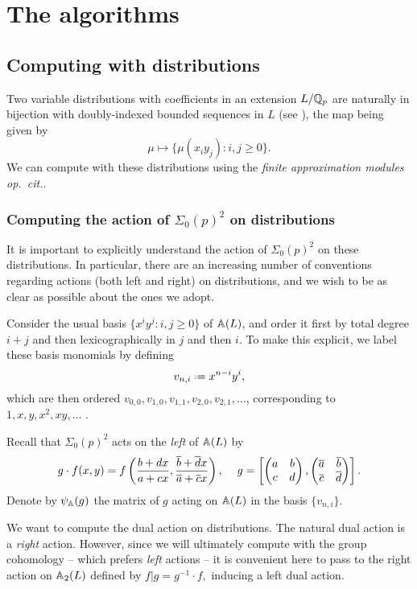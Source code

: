 \documentclass[a4paper,10pt]{article}
\numberwithin{equation}{section}
\begin{document}
\section{The algorithms}


\subsection{Computing with distributions}
Two variable distributions with coefficients in an extension $L/\mathbb{Q}_p$ are naturally in bijection with doubly-indexed bounded sequences in $L$ (see \cite[Proposition 3.6]{Wil17}), the map being given by
\[
 \mu \mapsto \{\mu(x_iy_j) : i,j \geq 0\}. 
\]
We can compute with these distributions using the \emph{finite approximation modules} \emph{op.\ cit.}.

\subsubsection{Computing the action of \texorpdfstring{$\Sigma_0(p)^2$}{S0(p)2} on distributions}

It is important to explicitly understand the action of $\Sigma_0(p)^2$ on these distributions. In particular, there are an increasing number of conventions regarding actions (both left and right) on distributions, and we wish to be as clear as possible about the ones we adopt.
\begin{definition}
Consider the usual basis $\{x^iy^j : i,j \geq 0\}$ of $\mathbb{A}(L)$, and order it first by total degree $i+j$ and then lexicographically in $j$ and then $i$. To make this explicit, we label these basis monomials by defining
\[
	v_{n,i} \defeq x^{n-i}y^{i},
 \]
which are then ordered $v_{0,0}, v_{1,0},v_{1,1},v_{2,0},v_{2,1},\dots$, corresponding to $1,x,y,x^2,xy,\dots$ .
\end{definition}
Recall that $\Sigma_0(p)^2$ acts on the \emph{left} of $\mathbb{A}(L)$ by
\[
	g \cdot f(x,y) = f\left(\frac{b+dx}{a+cx},\frac{\overline{b}+\overline{d}x}{\overline{a} + \overline{c}x}\right), \hspace{12pt} g = \left[\begin{pmatrix}a & b\\c & d\end{pmatrix},\begin{pmatrix}\overline{a} & \overline{b}\\\overline{c} & \overline{d}\end{pmatrix}\right].
\]
Denote by $\psi_{\mathbb{A}}(g)$ the matrix of $g$ acting on $\mathbb{A}(L)$ in the basis $
\{v_{n,i}\}$.

We want to compute the dual action on distributions. The natural dual action is a \emph{right} action. However, since we will ultimately compute with the group cohomology -- which prefers \emph{left} actions -- it is convenient here to pass to the right action on $\mathbb{A}_2(L)$ defined by $f|g = g^{-1}\cdot f,$ inducing a left dual action. 
\end{document}
